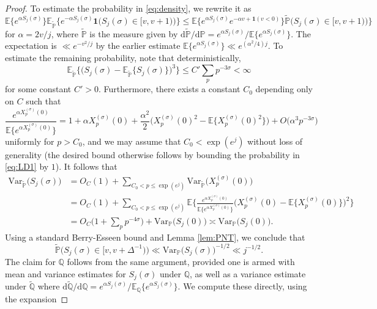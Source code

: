 \documentclass{amsart}
\theoremstyle{definition}
\theoremstyle{remark}
\numberwithin{equation}{section}
\begin{document}
\begin{proof}
To estimate the probability in \eqref{eq:density}, we rewrite it as
\begin{equation}\label{eq:LD1}
    \mathbb{E}\big\{e^{\alpha S_j(\sigma)}\big\} \mathbb{E}_{\tilde{\mathbb{\mathbb{P}}}}\big\{e^{-\alpha S_j(\sigma)}\mathbf{1}\big(S_{j}(\sigma)\in [v,v+1)\big)\big\} \leq \mathbb{E}\big\{e^{\alpha S_j(\sigma)}e^{-\alpha v+\mathbf{1}(v<0)}\big\}\tilde{\mathbb{\mathbb{P}}}\big(S_{j}(\sigma)\in [v,v+1)\big)\big\}
\end{equation}
for $\alpha=2v/j$, where $\tilde{\mathbb{\mathbb{P}}}$ is the measure given by $\mathrm{d}\tilde{\mathbb{\mathbb{P}}}/{\mathrm{d}\mathbb{P}}={e^{\alpha S_{j}(\sigma)}}/{\mathbb{E}\{e^{\alpha S_{j}(\sigma)}}\}$. The expectation is $\ll e^{-v^2/j}$ by the earlier estimate $\mathbb{E}\{e^{\alpha S_j(\sigma)}\}\ll e^{(\alpha^2/4)j}$. To estimate the remaining probability, note that deterministically,
\[  
    \mathbb{E}_{\tilde{\mathbb{P}}}\Big\{\Big(S_j(\sigma)-\mathbb{E}_{\tilde{\mathbb{P}}}\big\{S_j(\sigma)\big\}\Big)^3\Big\}\leq C'\sum_{p} p^{-3\sigma} <\infty
\]
for some constant $C'>0$. Furthermore, there exists a constant $C_0$ depending only on $C$ such that 
\[  
    \frac{e^{\alpha X_p^{(\sigma)}(0)}}{\mathbb{E}\big\{e^{\alpha X_p^{(\sigma)}(0)}\big\}}=1+\alpha X_p^{(\sigma)}(0)+\frac{\alpha^2}{2}\Big(X_p^{(\sigma)}(0)^2-\mathbb{E}\big\{X_p^{(\sigma)}(0)^2\big\}\Big)+O(\alpha^3p^{-3\sigma}\big)
\]
uniformly for $p>C_0$, and we may assume that $C_0<\exp(e^j)$ without loss of generality (the desired bound otherwise follows by bounding the probability in \eqref{eq:LD1} by $1$). It follows that
\begin{align*}
    \mathrm{Var}_{\tilde{\mathbb{P}}}\big(S_j(\sigma)\big) &= O_C(1)+ \sum_{C_0<p\leq \exp(e^j)} \mathrm{Var}_{\tilde{\mathbb{P}}}\big(X_p^{(\sigma)}(0)\big) \\
    &= O_C(1)+\sum_{C_0<p\leq \exp(e^j)}\mathbb{E}\bigg\{\frac{e^{\alpha X_p^{(\sigma)}(0)}}{\mathbb{E}\big\{e^{\alpha X_p^{(\sigma)}(0)}\big\}}\Big(X_p^{(\sigma)}(0)-\mathbb{E}\big\{X_p^{(\sigma)}(0)\big\}\Big)^2\bigg\}\\
    &= O_C\big(1+\sum_p p^{-4\sigma}\big)+\mathrm{Var}_{\mathbb{P}}\big(S_j(0)\big) \asymp \mathrm{Var}_{\mathbb{P}}\big(S_j(0)\big).
\end{align*}
Using a standard Berry-Esseen bound and Lemma \ref{lem:PNT}, we conclude that
\[
    \tilde{\mathbb{\mathbb{P}}}\big(S_{j}(\sigma)\in [v,v+\Delta^{-1})\big)\ll \mathrm{Var}_{{\mathbb{P}}}\big(S_j(\sigma)\big)^{-1/2}\ll j^{-1/2}.
\]
The claim for $\mathbb{Q}$ follows from the same argument, provided one is armed with mean and variance estimates for $S_j(\sigma)$ under $\mathbb{Q}$, as well as a variance estimate under $\tilde{\mathbb{Q}}$ where $\mathrm{d}\tilde{\mathbb{\mathbb{Q}}}/{\mathrm{d}\mathbb{Q}}={e^{\alpha S_{j}(\sigma)}}/{\mathbb{E}_{\mathbb{Q}}\big\{e^{\alpha S_{j}(\sigma)}}\big\}$. We compute these directly, using the expansion

\end{proof}
\end{document}
